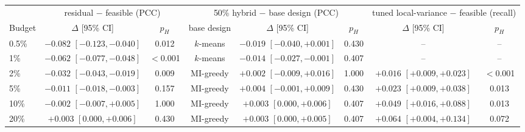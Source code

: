 \begin{tabular}{lccccccc}
\toprule
 & \multicolumn{2}{c}{residual $-$ feasible (PCC)} & \multicolumn{3}{c}{50\% hybrid $-$ base design (PCC)} & \multicolumn{2}{c}{tuned local-variance $-$ feasible (recall)} \\
\cmidrule(lr){2-3}\cmidrule(lr){4-6}\cmidrule(lr){7-8}
Budget & $\Delta$ [95\% CI] & $p_H$ & base design & $\Delta$ [95\% CI] & $p_H$ & $\Delta$ [95\% CI] & $p_H$ \\
\midrule
0.5\% & $-0.082$ $[-0.123, -0.040]$ & 0.012 & $k$-means & $-0.019$ $[-0.040, {+}0.001]$ & 0.430 & -- & -- \\
1\% & $-0.062$ $[-0.077, -0.048]$ & $<$0.001 & $k$-means & $-0.014$ $[-0.027, -0.001]$ & 0.407 & -- & -- \\
2\% & $-0.032$ $[-0.043, -0.019]$ & 0.009 & MI-greedy & ${+}0.002$ $[-0.009, {+}0.016]$ & 1.000 & ${+}0.016$ $[{+}0.009, {+}0.023]$ & $<$0.001 \\
5\% & $-0.011$ $[-0.018, -0.003]$ & 0.157 & MI-greedy & ${+}0.004$ $[-0.001, {+}0.009]$ & 0.430 & ${+}0.023$ $[{+}0.009, {+}0.038]$ & 0.013 \\
10\% & $-0.002$ $[-0.007, {+}0.005]$ & 1.000 & MI-greedy & ${+}0.003$ $[0.000, {+}0.006]$ & 0.407 & ${+}0.049$ $[{+}0.016, {+}0.088]$ & 0.013 \\
20\% & ${+}0.003$ $[0.000, {+}0.006]$ & 0.430 & MI-greedy & ${+}0.003$ $[0.000, {+}0.005]$ & 0.407 & ${+}0.064$ $[{+}0.004, {+}0.134]$ & 0.072 \\
\bottomrule
\end{tabular}
